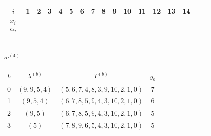 \documentclass[12pt]{article}
\def\red{\textcolor{red}}
\numberwithin{equation}{section}
\def\red{\textcolor{red}}
\theoremstyle{plain}
\begin{document}
\begin{table}[h]
	\centering
	\begin{minipage}{0.5\textwidth}
		\centering
		\vspace{0.3em}
		\fontsize{11}{9}\selectfont  %
		\renewcommand{\arraystretch}{1.5}  %
		\setlength{\tabcolsep}{0.3em} %
		\begin{tabular}{c|cccccccccccccccc}
			$i$ & 1 & 2 & 3 & 4 & 5 & 6 & 7 & 8 & 9 & 10 &11&12&13&14 \\
			\hline
			\multirow{2}{*}{$\begin{array}{c} x_i \\ \alpha_i \end{array}$} 
			& \makebox[0.7em][r]{1} & \makebox[0.7em][r]{1} & \makebox[0.7em][r]{1} & \makebox[0.7em][r]{2} & \makebox[0.7em][r]{2} & \makebox[0.7em][r]{2} & \makebox[0.7em][r]{3} & \makebox[0.7em][r]{3} & \makebox[0.7em][r]{4} & \makebox[0.7em][r]{4} & \makebox[0.7em][r]{5} & \makebox[0.7em][r]{5} & \makebox[0.7em][r]{5} & \makebox[0.7em][r]{5}\\
			& \makebox[0.7em][r]{$\red{3}$}
			& \makebox[0.7em][r]{$2$} 
			& \makebox[0.7em][r]{$2$} 
			& \makebox[0.7em][r]{$\red{4}$} 
			& \makebox[0.7em][r]{$\red{5}$} 
			& \makebox[0.7em][r]{$\red{5}$} 
			& \makebox[0.7em][r]{$\red{5}$} 
			& \makebox[0.7em][r]{$1$} 
			& \makebox[0.7em][r]{$5$} 
			& \makebox[0.7em][r]{$4$}
			& \makebox[0.7em][r]{$3$}
			& \makebox[0.7em][r]{$1$} 
			& \makebox[0.7em][r]{$2$}
			& \makebox[0.7em][r]{$1$} \\
		\end{tabular}
		\\[0.5em] %
		{\small $w^{(4)}$} %
	\end{minipage}
	\hfill
	\begin{minipage}{0.44\textwidth}
		\centering
		\vspace{0.3em}
		\fontsize{11}{9}\selectfont  %
		\renewcommand{\arraystretch}{1.5}  %
		\setlength{\tabcolsep}{0.5em} %
		\begin{tabular}{|c|c|c|c|}
			\hline
			$b$ & $\lambda^{(b)}$ & $T^{(b)}$ & $y_b$ \\
			\hline
			0 & $(9,9,5,4)$ & $(5,6,7,4,8,3,9,10,2,1,0)$ & 7 \\
			\hline
			1 & $(9,5,4)$ & $(6,7,8,5,9,4,3,10,2,1,0)$ & 6 \\
			\hline
			2 & $(9,5)$ & $(6,7,8,5,9,4,3,10,2,1,0)$ & 5 \\
			\hline
			3 & $(5)$ & $(7,8,9,6,5,4,3,10,2,1,0)$ & 5 \\
			\hline
		\end{tabular}
		\\[0.5em]
	\end{minipage}
\end{table}
\end{document}
